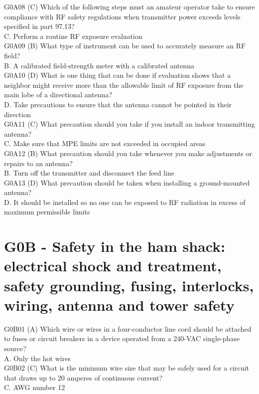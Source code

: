 \documentclass[12pt,letterpaper]{report}
\begin{document}
G0A08 (C) Which of the following steps must an amateur operator take to ensure compliance with RF safety regulations when transmitter power exceeds levels specified in part 97.13?\\
C. Perform a routine RF exposure evaluation\\

G0A09 (B) What type of instrument can be used to accurately measure an RF field?\\
B. A calibrated field-strength meter with a calibrated antenna\\

G0A10 (D) What is one thing that can be done if evaluation shows that a neighbor might receive more than the allowable limit of RF exposure from the main lobe of a directional antenna?\\
D. Take precautions to ensure that the antenna cannot be pointed in their direction\\

G0A11 (C) What precaution should you take if you install an indoor transmitting antenna?\\
C. Make sure that MPE limits are not exceeded in occupied areas\\

G0A12 (B) What precaution should you take whenever you make adjustments or repairs to an antenna?\\
B. Turn off the transmitter and disconnect the feed line\\

G0A13 (D) What precaution should be taken when installing a ground-mounted antenna?\\
D. It should be installed so no one can be exposed to RF radiation in excess of maximum permissible limits\\

\section{G0B - Safety in the ham shack: electrical shock and treatment, safety grounding, fusing, interlocks, wiring, antenna and tower safety}


G0B01 (A) Which wire or wires in a four-conductor line cord should be attached to fuses or circuit breakers in a device operated from a 240-VAC single-phase source?\\
A. Only the hot wires \\

G0B02 (C) What is the minimum wire size that may be safely used for a circuit that draws up to 20 amperes of continuous current?\\
C. AWG number 12\\
\end{document}
